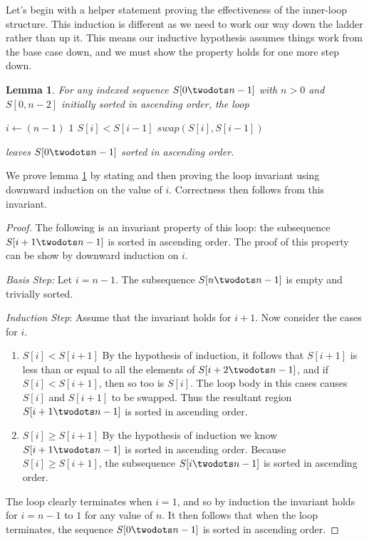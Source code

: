 \documentclass[]{tufte-handout}
\newtheorem{lemma}{Lemma}
\begin{document}
Let's begin with a helper statement proving the effectiveness of the inner-loop structure. This induction is different as we need to work our way down the ladder rather than up it. This means our inductive hypothesis assumes things work from the base case down, and we must show the property holds for one more step down.  
\begin{lemma}
For any indexed sequence $S[0 \twodots n-1]$ with $n > 0$ and $S[0,n-2]$ initially sorted in ascending order, the loop  
\begin{codebox}
\li \For $i \gets (n-1)$ \To $1$ 
\li \Do
	   \If $S[i] < S[i-1]$
\li	   \Then $swap(S[i],S[i-1])$
		\End
	\End		
\end{codebox}
leaves $S[0 \twodots n-1]$ sorted in ascending order.
\label{lm:insertLoop}
\end{lemma}

We prove lemma \ref{lm:insertLoop} by stating and then proving the loop invariant using downward induction on the value of $i$. Correctness then follows from this invariant. 
\begin{proof}
The following is an invariant property of this loop: the subsequence $S[i+1 \twodots n-1]$ is sorted in ascending order. The proof of this property can be show by downward induction on $i$.

\textit{Basis Step:} Let $i=n-1$. The subsequence $S[n \twodots n-1]$ is empty and trivially sorted.

\textit{Induction Step}: Assume that the invariant holds for $i+1$. Now consider the cases for $i$.
\begin{enumerate}
\item $S[i] < S[i+1]$
By the hypothesis of induction, it follows that $S[i+1]$ is less than or equal to all the elements of $S[i+2 \twodots n-1]$, and if $S[i] < S[i+1]$, then so too is $S[i]$. The loop body in this cases causes $S[i]$ and $S[i+1]$ to be swapped. Thus the resultant region $S[i+1 \twodots n-1]$ is sorted in ascending order.
\item $S[i] \geq S[i+1]$
By the hypothesis of induction we know $S[i+1 \twodots n-1]$ is sorted in ascending order. Because $S[i] \geq S[i+1]$, the subsequence $S[i \twodots n-1]$ is sorted in ascending order.
\end{enumerate}  
The loop clearly terminates when $i=1$, and so by induction the invariant holds for $i=n-1$ to $1$ for any value of $n$.  It then follows that when the loop terminates, the sequence $S[0 \twodots n-1]$ is sorted in ascending order.
\end{proof}
\end{document}
